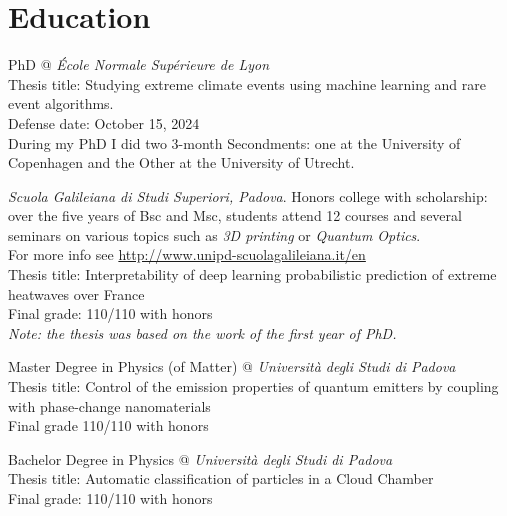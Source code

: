 \documentclass[11pt, a4 paper]{article}
\begin{document}
\section*{Education}
  \begin{description}[style=multiline,leftmargin=3cm,align=right]
    \item[2021-2024]
      PhD @ \emph{\'Ecole Normale Supérieure de Lyon} \\
      Thesis title: Studying extreme climate events using machine learning and rare event algorithms. \\
      Defense date: October 15, 2024 \\
      During my PhD I did two 3-month Secondments: one at the University of Copenhagen and the Other at the University of Utrecht.
    \item[2016-2022]
      \emph{Scuola Galileiana di Studi Superiori, Padova}. Honors college with scholarship: over the five years of Bsc and Msc, students attend 12 courses and several seminars on various topics such as \emph{3D printing} or \emph{Quantum Optics}. \\ For more info see \url{http://www.unipd-scuolagalileiana.it/en} \\
      Thesis title: Interpretability of deep learning probabilistic prediction of extreme heatwaves over France \\
      Final grade: 110/110 with honors \\
      \emph{Note: the thesis was based on the work of the first year of PhD.}
    \item[2019-2021]
      Master Degree in Physics (of Matter) @ \emph{Università degli Studi di Padova} \\
      Thesis title: Control of the emission properties of quantum emitters by coupling with phase-change nanomaterials \\
      Final grade 110/110 with honors
    \item[2016-2019]
      Bachelor Degree in Physics @ \emph{Università degli Studi di Padova} \\
      Thesis title: Automatic classification of particles in a Cloud Chamber \\
      Final grade: 110/110 with honors
  \end{description}
\end{document}
